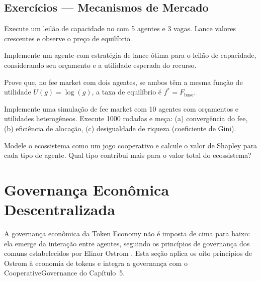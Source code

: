 \subsection{Exercícios — Mecanismos de Mercado}

\begin{exercicio}
Execute um leilão de capacidade no \opencodeeco{} com 5 agentes
e 3 vagas. Lance valores crescentes e observe o preço de
equilíbrio.
\end{exercicio}

\begin{exercicio}
Implemente um agente com estratégia de lance ótima para o leilão
de capacidade, considerando seu orçamento e a utilidade esperada
do recurso.
\end{exercicio}

\begin{exercicio}
Prove que, no fee market com dois agentes, se ambos têm a mesma
função de utilidade $U(g) = \log(g)$, a taxa de equilíbrio é
$f^* = F_{\text{base}}$.
\end{exercicio}

\begin{exercicio}
Implemente uma simulação de fee market com 10 agentes com
orçamentos e utilidades heterogêneos. Execute 1000 rodadas e
meça: (a) convergência do fee, (b) eficiência de alocação,
(c) desigualdade de riqueza (coeficiente de Gini).
\end{exercicio}

\begin{exercicio}
Modele o ecossistema como um jogo cooperativo e calcule o valor
de Shapley para cada tipo de agente. Qual tipo contribui mais
para o valor total do ecossistema?
\end{exercicio}

\section{Governança Econômica Descentralizada}
\label{sec:governanca-economica}
\nivelphd

A governança econômica da Token Economy não é imposta de cima
para baixo: ela emerge da interação entre agentes, seguindo os
princípios de governança dos comuns estabelecidos por Elinor
Ostrom \cite{ostrom1990governing}. Esta seção aplica os oito
princípios de Ostrom à economia de tokens e integra a governança
com o CooperativeGovernance do Capítulo~5.

